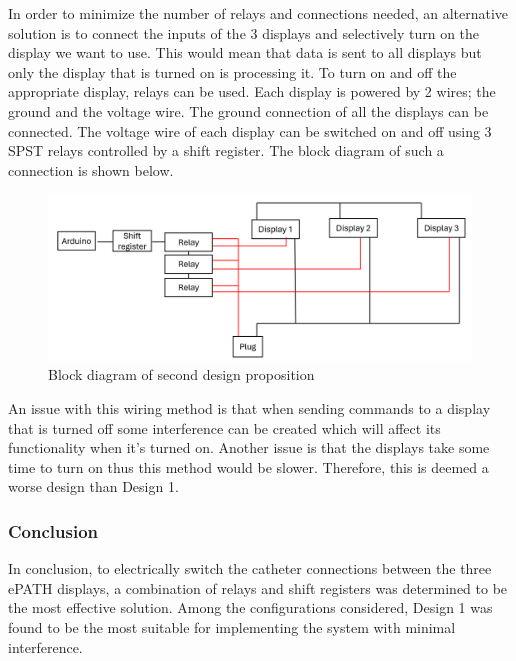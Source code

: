 {In order to minimize the number of relays and connections needed, an alternative solution is to connect the inputs of the 3 displays and selectively turn on the display we want to use. This would mean that data is sent to all displays but only the display that is turned on is processing it.
To turn on and off the appropriate display, relays can be used. Each display is powered by 2 wires; the ground and the voltage wire. The ground connection of all the displays can be connected. The voltage wire of each display can be switched on and off using 3 SPST relays controlled by a shift register.  The block diagram of such a connection is shown below.
\begin{figure}[H]
          \centering
          \includegraphics[width=1\linewidth]{img/Design2.png}
          \caption{Block diagram of second design proposition}
          \label{button_wiring}
    \end{figure}
An issue with this wiring method is that when sending commands to a display that is turned off some interference can be created which will affect its functionality when it’s turned on. Another issue is that the displays take some time to turn on thus this method would be slower. Therefore, this is deemed a worse design than Design 1.


\subsubsection{Conclusion}
In conclusion, to electrically switch the catheter connections between the three ePATH displays, a combination of relays and shift registers was determined to be the most effective solution. Among the configurations considered, Design 1 was found to be the most suitable for implementing the system with minimal interference.





}
